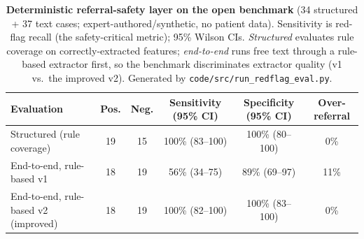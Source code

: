\begin{table}[htbp]
\centering
\caption{\textbf{Deterministic referral-safety layer on the open benchmark} (34 structured + 37 text cases; expert-authored/synthetic, no patient data). Sensitivity is red-flag recall (the safety-critical metric); 95\% Wilson CIs. \emph{Structured} evaluates rule coverage on correctly-extracted features; \emph{end-to-end} runs free text through a rule-based extractor first, so the benchmark discriminates extractor quality (v1 vs.\ the improved v2). Generated by \texttt{code/src/run\_redflag\_eval.py}.}
\label{tab:redflag_results}
\small
\begin{tabular}{lccccc}
\toprule
Evaluation & Pos. & Neg. & Sensitivity (95\% CI) & Specificity (95\% CI) & Over-referral \\
\midrule
Structured (rule coverage) & 19 & 15 & 100\% (83--100) & 100\% (80--100) & 0\% \\
End-to-end, rule-based v1 & 18 & 19 & 56\% (34--75) & 89\% (69--97) & 11\% \\
End-to-end, rule-based v2 (improved) & 18 & 19 & 100\% (82--100) & 100\% (83--100) & 0\% \\
\bottomrule
\end{tabular}
\end{table}
